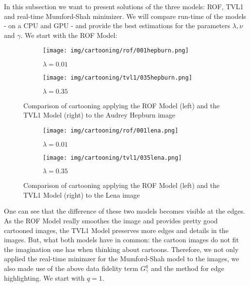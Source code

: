         In this subsection we want to present solutions of the three models: ROF, TVL1 and real-time Mumford-Shah minimizer. We will compare run-time of the models - on a CPU and GPU - and provide the best estimations for the parameters $\lambda, \nu$ and $\gamma$. We start with the ROF Model:

        \begin{figure}[ht]
            \centering
            \begin{subfigure}[b]{0.45\textwidth}
                \texttt{[image: img/cartooning/rof/001hepburn.png]}
                \caption{$\lambda = 0.01$}
            \end{subfigure}
            \begin{subfigure}[b]{0.45\textwidth}
                \texttt{[image: img/cartooning/tvl1/035hepburn.png]}
                \caption{$\lambda = 0.35$}
            \end{subfigure}
            \caption[Cartooning Comparison of Hepburn using ROF and TVL1]{Comparison of cartooning applying the ROF Model (left) and the TVL1 Model (right) to the Audrey Hepburn image}
        \label{fig:cartooning_comparison_hepburn}
        \end{figure}

        \begin{figure}[ht]
            \centering
            \begin{subfigure}[b]{0.45\textwidth}
                \texttt{[image: img/cartooning/rof/001lena.png]}
                \caption{$\lambda = 0.01$}
            \end{subfigure}
            \begin{subfigure}[b]{0.45\textwidth}
                \texttt{[image: img/cartooning/tvl1/035lena.png]}
                \caption{$\lambda = 0.35$}
            \end{subfigure}
            \caption[Cartooning Comparison of Lena using ROF and TVL1]{Comparison of cartooning applying the ROF Model (left) and the TVL1 Model (right) to the Lena image}
        \label{fig:cartooning_comparison_lena}
        \end{figure}

        One can see that the difference of these two models becomes visible at the edges. As the ROF Model really smoothes the image and provides pretty good cartooned images, the TVL1 Model preserves more edges and details in the images. But, what both models have in common: the cartoon images do not fit the imagination one has when thinking about cartoons. Therefore, we not only applied the real-time minimzer for the Mumford-Shah model to the images, we also made use of the above data fidelity term $G^{q}_{\gamma}$ and the method for edge highlighting. We start with $q = 1$.

